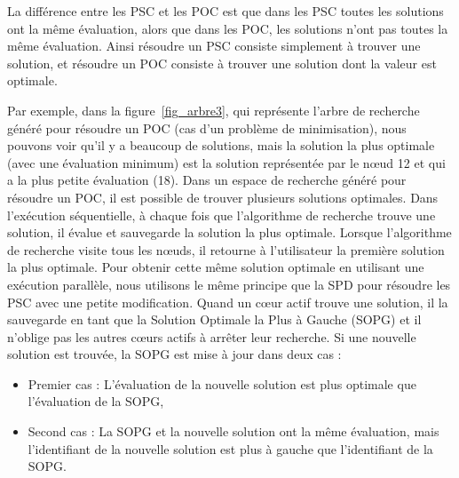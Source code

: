 \documentclass[parallelisme]{compas2014}
\begin{document}
La différence entre les PSC et les POC est que dans les PSC toutes les solutions ont la même évaluation, alors que dans les POC, les solutions n'ont pas toutes la même évaluation. Ainsi résoudre un PSC consiste simplement à trouver une solution, et résoudre un POC consiste à trouver une solution dont la valeur est optimale.

Par exemple, dans la figure~\ref{fig_arbre3}, qui représente l'arbre de recherche généré pour résoudre un POC (cas d'un problème de minimisation), nous pouvons voir qu'il y a beaucoup de solutions, mais la solution la plus optimale (avec une évaluation minimum) est la solution représentée par le nœud 12 et qui a la plus petite évaluation (18). Dans un espace de recherche généré pour résoudre un POC, il est possible de trouver plusieurs solutions optimales. Dans l'exécution séquentielle, à chaque fois que l'algorithme de recherche trouve une solution, il évalue et sauvegarde la solution la plus optimale. Lorsque l'algorithme de recherche visite tous les nœuds, il retourne à l'utilisateur la première solution la plus optimale. Pour obtenir cette même solution optimale en utilisant une exécution parallèle, nous utilisons le même principe que la SPD pour résoudre les PSC avec une petite modification. Quand un cœur actif trouve une solution, il la sauvegarde en tant que la Solution Optimale la Plus à Gauche (SOPG) et il n'oblige pas les autres cœurs actifs à arrêter leur recherche. Si une nouvelle solution est trouvée, la SOPG est mise à jour dans deux cas :

\begin{itemize}
\item Premier cas : L'évaluation de la nouvelle solution est plus optimale que l'évaluation de la SOPG,
\item Second cas : La SOPG et la nouvelle solution ont la même évaluation, mais l'identifiant de la nouvelle solution est plus à gauche que l'identifiant de la SOPG.
\end{itemize}
\end{document}
